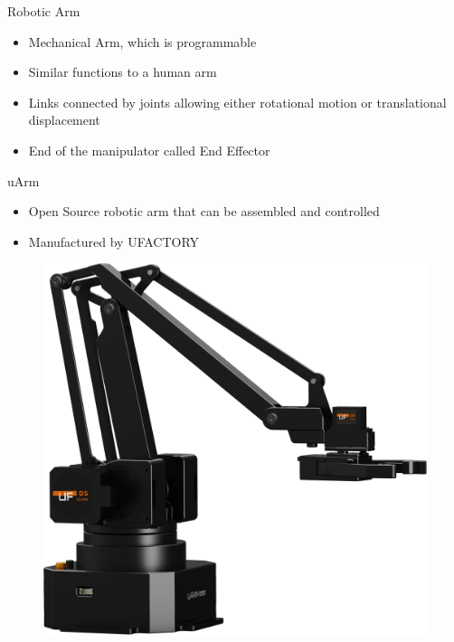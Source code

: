 \documentclass{beamer}
\begin{document}
\begin{frame}{Robotic Arm}
\begin{itemize}
\item Mechanical Arm, which is programmable
\item Similar functions to a human arm
\item Links connected by joints allowing either rotational motion or translational displacement
\item End of the manipulator called End Effector
\end{itemize} 
\end{frame}

\begin{frame}{uArm}
\begin{itemize}
\item Open Source robotic arm that can be assembled and controlled
\item Manufactured by UFACTORY
\end{itemize}
\begin{figure}
\includegraphics[scale=0.075]{uarm.png}
\end{figure}
\end{frame}
\end{document}
